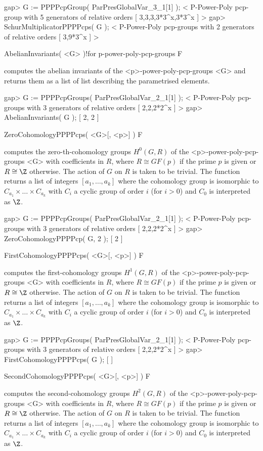 \beginexample
gap> G := PPPPcpGroup( ParPresGlobalVar_3_1[1] );
< P-Power-Poly pcp-group with 5 generators of relative orders [ 3,3,3,3*3^x,3*3^x ] >
gap> SchurMultiplicatorPPPPcps( G );
< P-Power-Poly pcp-groups with 2 generators of relative orders [ 3,9*3^x ] >
\endexample

\>AbelianInvariants( <G> )!{for p-power-poly-pcp-groups} F

computes the abelian invariants of the <p>-power-poly-pcp-groups <G> and returns
them as a list of list describing the parametrised elements.

\beginexample
gap> G := PPPPcpGroups( ParPresGlobalVar_2_1[1] );
< P-Power-Poly pcp-groups with 3 generators of relative orders [ 2,2,2*2^x ] >
gap> AbelianInvariants( G );
[ 2, 2 ]
\endexample

\>ZeroCohomologyPPPPcps( <G>[, <p>] ) F

computes the zero-th-cohomology groups $H^0(G,R)$ of the 
<p>-power-poly-pcp-groups <G> with coefficients in $R$, where $R \cong GF(p)$ if
the prime $p$ is given or $R \cong \Z$ otherwise. The action of $G$ on $R$ is
taken to be trivial. The function returns a list of integers $[a_1,\ldots,
a_k]$ where the cohomology group is isomorphic to $C_{a_1} \times \ldots 
\times C_{a_k}$ with $C_i$ a cyclic group of order $i$ (for $i > 0$) and $C_0$ 
is interpreted as $\Z$.

\beginexample
gap> G := PPPPcpGroups( ParPresGlobalVar_2_1[1] );
< P-Power-Poly pcp-groups with 3 generators of relative orders [ 2,2,2*2^x ] >
gap> ZeroCohomologyPPPPcp( G, 2 );
[ 2 ]
\endexample

\>FirstCohomologyPPPPcps( <G>[, <p>] ) F

computes the first-cohomology groups $H^1(G,R)$ of the 
<p>-power-poly-pcp-groups <G> with coefficients in $R$, where $R \cong GF(p)$ if
the prime $p$ is given or $R \cong \Z$ otherwise. The action of $G$ on $R$ is
taken to be trivial. The function returns a list of integers $[a_1,\ldots,
a_k]$ where the cohomology group is isomorphic to $C_{a_1} \times \ldots 
\times C_{a_k}$ with $C_i$ a cyclic group of order $i$ (for $i > 0$) and $C_0$ 
is interpreted as $\Z$.

\beginexample
gap> G := PPPPcpGroups( ParPresGlobalVar_2_1[1] );
< P-Power-Poly pcp-groups with 3 generators of relative orders [ 2,2,2*2^x ] >
gap> FirstCohomologyPPPPcps( G );
[  ]
\endexample

\>SecondCohomologyPPPPcps( <G>[, <p>] ) F

computes the second-cohomology groups $H^2(G,R)$ of the 
<p>-power-poly-pcp-groups <G> with coefficients in $R$, where $R \cong GF(p)$ if
the prime $p$ is given or $R \cong \Z$ otherwise. The action of $G$ on $R$ is
taken to be trivial. The function returns a list of integers $[a_1,\ldots,
a_k]$ where the cohomology group is isomorphic to $C_{a_1} \times \ldots 
\times C_{a_k}$ with $C_i$ a cyclic group of order $i$ (for $i > 0$) and $C_0$ 
is interpreted as $\Z$.

